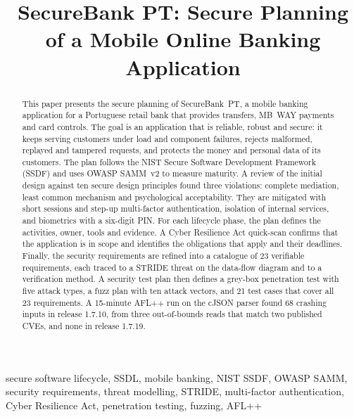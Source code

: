 \documentclass[conference,a4paper]{IEEEtran}
\begin{document}
\title{SecureBank PT: Secure Planning of a Mobile Online Banking Application}

\author{
}

\maketitle

\begin{abstract}
This paper presents the secure planning of SecureBank~PT, a mobile banking
application for a Portuguese retail bank that provides transfers, MB~WAY
payments and card controls. The goal is an application that is reliable,
robust and secure: it keeps serving customers under load and component
failures, rejects malformed, replayed and tampered requests, and protects
the money and personal data of its customers. The plan follows the NIST
Secure Software Development Framework (SSDF) and uses OWASP SAMM~v2 to
measure maturity.
A review of the initial design against ten secure design principles found
three violations: complete mediation, least common mechanism and
psychological acceptability. They are mitigated with short sessions and
step-up multi-factor authentication, isolation of internal services, and
biometrics with a six-digit PIN. For each lifecycle phase, the plan
defines the activities, owner, tools and evidence. A Cyber Resilience Act
quick-scan confirms that the application is in scope and identifies the
obligations that apply and their deadlines. Finally, the security
requirements are refined into a catalogue of 23 verifiable requirements,
each traced to a STRIDE threat on the data-flow diagram and to a
verification method. A security test plan then defines a grey-box
penetration test with five attack types, a fuzz plan with ten attack
vectors, and 21 test cases that cover all 23 requirements. A 15-minute
AFL++ run on the cJSON parser found 68 crashing inputs in release
1.7.10, from three out-of-bounds reads that match two published CVEs,
and none in release 1.7.19.
\end{abstract}

\begin{IEEEkeywords}
secure software lifecycle, SSDL, mobile banking, NIST SSDF, OWASP SAMM, security requirements, threat modelling, STRIDE, multi-factor authentication, Cyber Resilience Act, penetration testing, fuzzing, AFL++
\end{IEEEkeywords}
\end{document}
